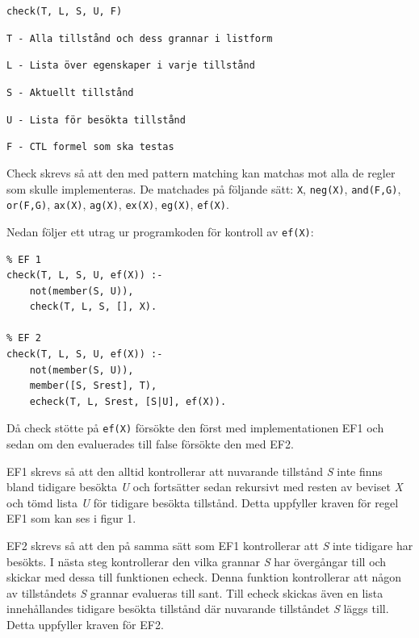 \begin{center}
\begin{minipage}{0.75\textwidth}
\texttt{check(T, L, S, U, F)}

\texttt{T - Alla tillstånd och dess grannar i listform}

\texttt{L - Lista över egenskaper i varje tillstånd}

\texttt{S - Aktuellt tillstånd}

\texttt{U - Lista för besökta tillstånd}

\texttt{F - CTL formel som ska testas}

\end{minipage}
\end{center}

Check skrevs så att den med pattern matching kan matchas mot alla de regler som skulle implementeras. De matchades på följande sätt: \texttt{X}, \texttt{neg(X)}, \texttt{and(F,G)}, \texttt{or(F,G)}, \texttt{ax(X)}, \texttt{ag(X)}, \texttt{ex(X)}, \texttt{eg(X)}, \texttt{ef(X)}.

Nedan följer ett utrag ur programkoden för kontroll av \texttt{ef(X)}:

\begin{center}
\begin{minipage}{0.6\textwidth}

\begin{lstlisting}
% EF 1
check(T, L, S, U, ef(X)) :-
	not(member(S, U)),
	check(T, L, S, [], X).

% EF 2
check(T, L, S, U, ef(X)) :-
	not(member(S, U)),
	member([S, Srest], T),
	echeck(T, L, Srest, [S|U], ef(X)).
\end{lstlisting}


\end{minipage}
\end{center}


Då check stötte på \texttt{ef(X)} försökte den först med implementationen EF1 och
sedan om den evaluerades till false försökte den med EF2.

EF1 skrevs så att den alltid kontrollerar att nuvarande tillstånd \textit{S} inte finns bland tidigare besökta \textit{U} och fortsätter sedan rekursivt med resten av beviset \textit{X} och tömd lista \textit{U} för tidigare besökta tillstånd. Detta uppfyller kraven för regel EF1 som kan ses i figur 1.

EF2 skrevs så att den på samma sätt som EF1 kontrollerar att \textit{S} inte
tidigare har besökts. I nästa steg kontrollerar den vilka grannar \textit{S} har
övergångar till och skickar med dessa till funktionen echeck. Denna funktion kontrollerar att
någon av tillståndets \textit{S} grannar evalueras till sant. Till echeck skickas även en lista innehållandes tidigare besökta tillstånd där nuvarande tillståndet \textit{S} läggs till. Detta uppfyller
kraven för EF2.

